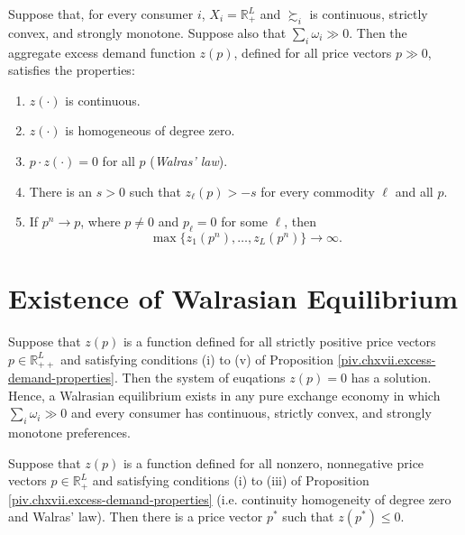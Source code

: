 \begin{prop}\label{piv.chxvii.excess-demand-properties}
    Suppose that, for every consumer $i$, $X_i = \mathbb{R}^L_+$ and $\succsim_i$ is continuous, strictly convex, and strongly monotone. Suppose also that $\sum_i \omega_i \gg 0$. Then the aggregate excess demand function $z(p)$, defined for all price vectors $p \gg 0$, satisfies the properties:
    \begin{enumerate}
        \item $z(\cdot)$ is continuous.
        \item $z(\cdot)$ is homogeneous of degree zero.
        \item $p \cdot z(\cdot) = 0$ for all $p$ (\emph{Walras' law}).
        \item There is an $s > 0$ such that $z_\ell(p) > -s$ for every commodity $\ell$ and all $p$.
        \item
        If $p^n \to p$, where $p \neq 0$ and $p_\ell = 0$ for some $\ell$, then
        \begin{equation*}
            \max \{z_1(p^n), \dots, z_L(p^n)\} \to \infty.
        \end{equation*}
    \end{enumerate}
\end{prop}


\section{Existence of Walrasian Equilibrium}

\begin{prop}
    Suppose that $z(p)$ is a function defined for all strictly positive price vectors $p \in \mathbb{R}^L_{++}$ and satisfying conditions (i) to (v) of Proposition \ref{piv.chxvii.excess-demand-properties}. Then the system of euqations $z(p) = 0$ has a solution. Hence, a Walrasian equilibrium exists in any pure exchange economy in which $\sum_i \omega_i \gg 0$ and every consumer has continuous, strictly convex, and strongly monotone preferences.
\end{prop}

\begin{prop}
    Suppose that $z(p)$ is a function defined for all nonzero, nonnegative price vectors $p \in \mathbb{R}^L_+$ and satisfying conditions (i) to (iii) of Proposition \ref{piv.chxvii.excess-demand-properties} (i.e. continuity homogeneity of degree zero and Walras' law). Then there is a price vector $p^*$ such that $z(p^*) \leq 0$.
\end{prop}


